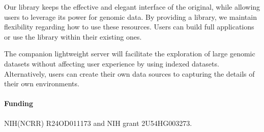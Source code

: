 \documentclass{bioinfo}
\begin{document}
Our library keeps the effective and elegant interface of the original,
while allowing users to leverage its power for genomic data. By providing a
library, we maintain flexibility regarding how to use these resources. Users
can build full applications or use the library within their existing ones.

The companion lightweight server will facilitate the exploration of large
genomic datasets without affecting user experience by using indexed datasets.
Alternatively, users can create their own data sources to capturing the details
of their own environments.

\paragraph{Funding\textcolon} NIH(NCRR) R24OD011173 and NIH grant 2U54HG003273.


\end{document}
